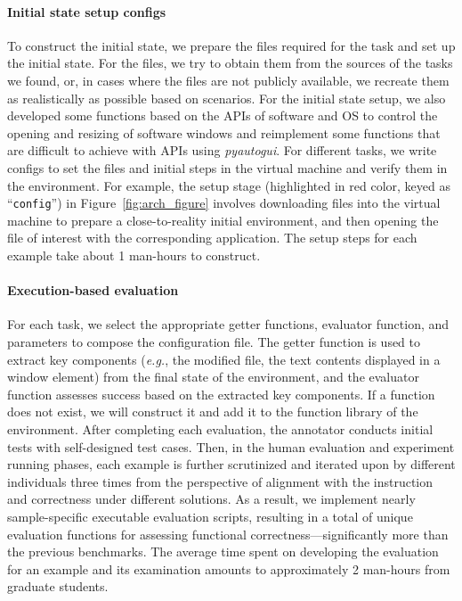 \paragraph{Initial state setup configs} 
To construct the initial state, we prepare the files required for the task and set up the initial state. 
For the files, we try to obtain them from the sources of the tasks we found, or, in cases where the files are not publicly available, we recreate them as realistically as possible based on scenarios. 
For the initial state setup, we also developed some functions based on the APIs of software and OS to control the opening and resizing of software windows and reimplement some functions that are difficult to achieve with APIs using \textit{pyautogui}. 
For different tasks, we write configs to set the files and initial steps in the virtual machine and verify them in the environment. 
For example, the setup stage (highlighted in red color, keyed as ``\verb|config|'') in 
Figure~\ref{fig:arch_figure} involves downloading files into the virtual machine
to prepare a close-to-reality initial environment, and then opening the
file of interest with the corresponding application.
The setup steps for each example take about 1 man-hours to construct.


\paragraph{Execution-based evaluation}
For each task, we select the appropriate getter functions, evaluator function, and parameters to compose the configuration file. 
The getter function is used to extract key components (\textit{e.g.}, the modified file, the text contents displayed in a window element) from the final state of the environment, and the evaluator function assesses success based on the extracted key components.
If a function does not exist, we will construct it and add it to the function library of the environment.
After completing each evaluation, the annotator conducts initial tests with self-designed test cases. 
Then, in the human evaluation and experiment running phases, each example is further scrutinized and iterated upon by different individuals three times from the perspective of alignment with the instruction and correctness under different solutions. 
As a result, we implement nearly sample-specific executable evaluation scripts, resulting in a total of \numevals unique evaluation functions for assessing functional correctness—significantly more than the previous benchmarks.
The average time spent on developing the evaluation for an example and its examination amounts to approximately 2 man-hours from graduate students.

